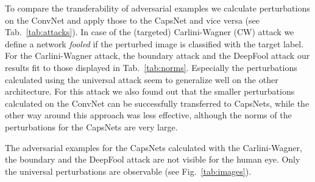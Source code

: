 \documentclass{article}
\begin{document}
To compare the transferability of adversarial examples we calculate
perturbations on the ConvNet and apply those to the CapsNet and vice
versa (see Tab.~\ref{tab:attacks}). In case of the (targeted)
Carlini-Wagner (CW) attack we define a network \emph{fooled} if the
perturbed image is classified with the target label. For the
Carlini-Wagner attack, the boundary attack and the DeepFool attack our
results fit to those displayed in Tab.~\ref{tab:norms}. Especially the
perturbations calculated using the universal attack seem to generalize
well on the other architecture. For this attack we also found out that
the smaller perturbations calculated on the ConvNet can be
successfully transferred to CapsNets, while the other way around this
approach was less effective, although the norms of the perturbations
for the CapsNets are very large.

The adversarial examples for the CapsNets calculated with the
Carlini-Wagner, the boundary and the DeepFool attack are not
visible for the human eye. Only the universal perturbations are
observable (see Fig.~\ref{tab:images}).
\end{document}
